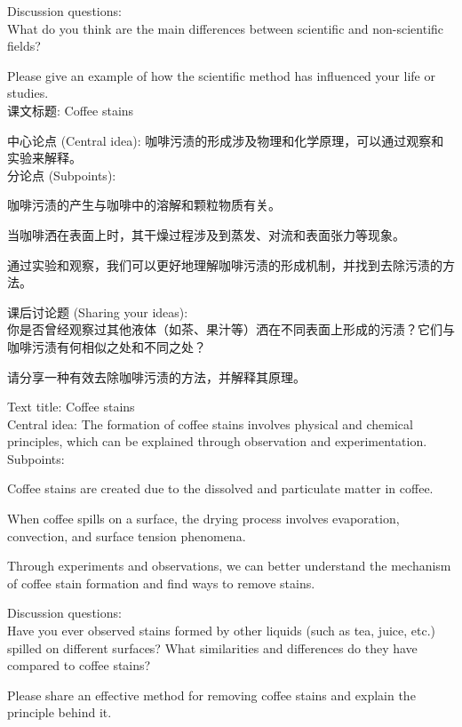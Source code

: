 \documentclass[a4paper,UTF8]{article}
\begin{document}
Discussion questions:\\

What do you think are the main differences between scientific and non-scientific fields?

Please give an example of how the scientific method has influenced your life or studies.\\

课文标题: Coffee stains

中心论点 (Central idea): 咖啡污渍的形成涉及物理和化学原理，可以通过观察和实验来解释。\\

分论点 (Subpoints):

咖啡污渍的产生与咖啡中的溶解和颗粒物质有关。

当咖啡洒在表面上时，其干燥过程涉及到蒸发、对流和表面张力等现象。

通过实验和观察，我们可以更好地理解咖啡污渍的形成机制，并找到去除污渍的方法。

课后讨论题 (Sharing your ideas):\\

你是否曾经观察过其他液体（如茶、果汁等）洒在不同表面上形成的污渍？它们与咖啡污渍有何相似之处和不同之处？

请分享一种有效去除咖啡污渍的方法，并解释其原理。

Text title: Coffee stains\\

Central idea: The formation of coffee stains involves physical and chemical principles, which can be explained through observation and experimentation.\\

Subpoints:

Coffee stains are created due to the dissolved and particulate matter in coffee.

When coffee spills on a surface, the drying process involves evaporation, convection, and surface tension phenomena.

Through experiments and observations, we can better understand the mechanism of coffee stain formation and find ways to remove stains.

Discussion questions:\\

Have you ever observed stains formed by other liquids (such as tea, juice, etc.) spilled on different surfaces? What similarities and differences do they have compared to coffee stains?

Please share an effective method for removing coffee stains and explain the principle behind it.\\
\end{document}
